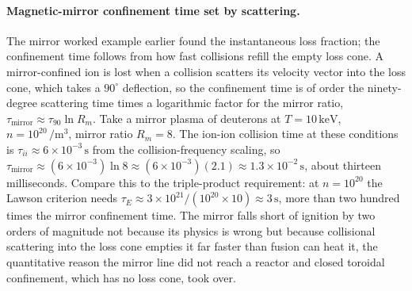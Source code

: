 \paragraph{Magnetic-mirror confinement time set by scattering.}
The mirror worked example earlier found the instantaneous loss fraction; the
confinement time follows from how fast collisions refill the empty loss cone.
A mirror-confined ion is lost when a collision scatters its velocity vector into
the loss cone, which takes a $90^{\circ}$ deflection, so the confinement time is
of order the ninety-degree scattering time times a logarithmic factor for the
mirror ratio, $\tau_{\mathrm{mirror}} \approx \tau_{90}\ln R_m$. Take a mirror
plasma of deuterons at $T = 10\,\si{\kilo\electronvolt}$, $n = 10^{20}\,\si{\per
\meter\cubed}$, mirror ratio $R_m = 8$. The ion-ion collision time at these
conditions is $\tau_{ii} \approx 6\times 10^{-3}\,\si{\second}$ from the
collision-frequency scaling, so $\tau_{\mathrm{mirror}} \approx (6\times
10^{-3})\ln 8 \approx (6\times 10^{-3})(2.1) \approx 1.3\times 10^{-2}\,\si{
\second}$, about thirteen milliseconds. Compare this to the triple-product
requirement: at $n = 10^{20}$ the Lawson criterion needs $\tau_E \approx
3\times 10^{21}/(10^{20}\times 10) \approx 3\,\si{\second}$, more than two
hundred times the mirror confinement time. The mirror falls short of ignition by
two orders of magnitude not because its physics is wrong but because collisional
scattering into the loss cone empties it far faster than fusion can heat it, the
quantitative reason the mirror line did not reach a reactor and closed toroidal
confinement, which has no loss cone, took over.

